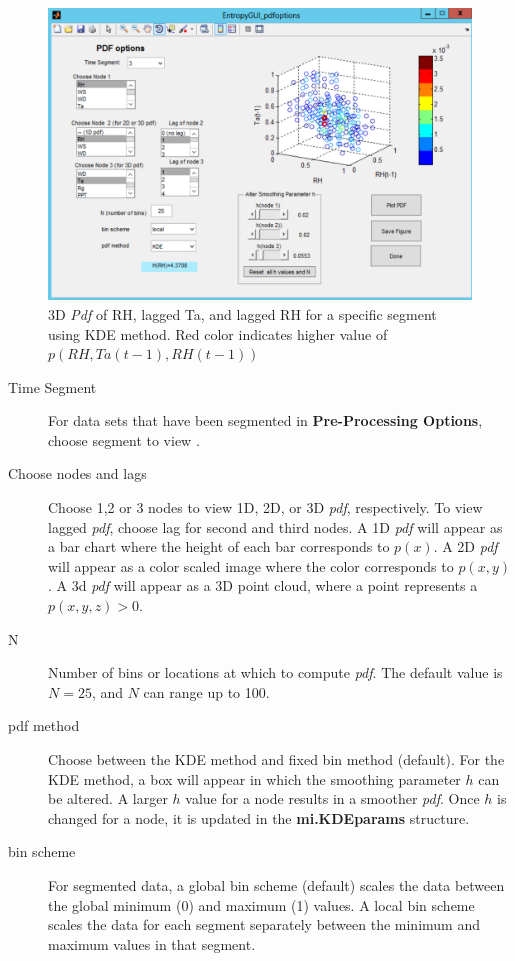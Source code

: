 \documentclass[a4paper]{article}
\begin{document}
\begin{figure}[h!]\label{fig:pdf_3D}
\begin{center}
\includegraphics[scale=.5]{Image_PDF_3D.pdf}
\caption{3D \textit{Pdf} of RH, lagged Ta, and lagged RH for a specific segment using KDE method.  Red color indicates higher value of $p(RH,Ta(t-1),RH(t-1))$}
\end{center}
\end{figure}

\begin{description}
\item[Time Segment] For data sets that have been segmented in \textbf{Pre-Processing Options}, choose segment to view .

\item[Choose nodes and lags] Choose 1,2 or 3 nodes to view 1D, 2D, or 3D \textit{pdf}, respectively. To view lagged \textit{pdf}, choose lag for second and third nodes.  A 1D \textit{pdf} will appear as a bar chart where the height of each bar corresponds to $p(x)$.  A 2D \textit{pdf} will appear as a color scaled image where the color corresponds to $p(x,y)$.  A 3d \textit{pdf} will appear as a 3D point cloud, where a point represents a $p(x,y,z)>0$. 

\item[N] Number of bins or locations at which to compute \textit{pdf}.  The default value is $N=25$, and $N$ can range up to 100.  
\item[pdf method] Choose between the KDE method and fixed bin method (default).  For the KDE method, a box will appear in which the smoothing parameter $h$ can be altered.  A larger $h$ value for a node results in a smoother \textit{pdf}.  Once $h$ is changed for a node, it is updated in the \textbf{mi.KDEparams} structure.
\item[bin scheme] For segmented data, a global bin scheme (default) scales the data between the global minimum (0) and maximum (1) values.  A local bin scheme scales the data for each segment separately between the minimum and maximum values in that segment.
\end{description}
\end{document}
